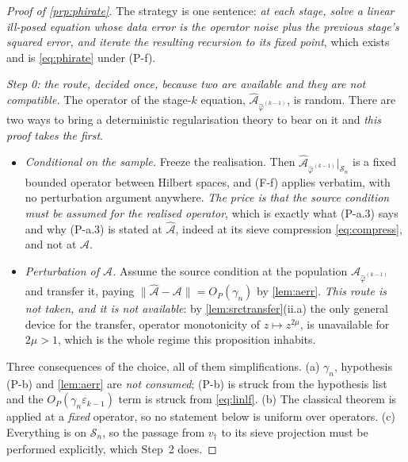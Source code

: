 \begin{proof}[Proof of \cref{prp:phirate}]
The strategy is one sentence: \emph{at each stage, solve a linear ill-posed equation whose data error
is the operator noise plus the previous stage's squared error, and iterate the resulting recursion to
its fixed point}, which exists and is \eqref{eq:phirate} under (P-f).

\emph{Step 0: the route, decided once, because two are available and they are not compatible.} The
operator of the stage-$k$ equation, $\hat{\mathcal A}_{\hat\varphi^{(k-1)}}$, is random. There are two
ways to bring a deterministic regularisation theory to bear on it and \emph{this proof takes the
first}.
\begin{itemize}
\item[--] \emph{Conditional on the sample.} Freeze the realisation. Then
$\hat{\mathcal A}_{\hat\varphi^{(k-1)}}\vert_{\mathcal S_n}$ is a fixed bounded operator between
Hilbert spaces, and (F-f) applies verbatim, with no perturbation argument anywhere. \emph{The price is
that the source condition must be assumed for the realised operator}, which is exactly what
(P-a.3) says and why (P-a.3) is stated at $\hat{\mathcal A}$, indeed at its sieve compression
\eqref{eq:compress}, and not at $\mathcal A$.
\item[--] \emph{Perturbation of $\mathcal A$.} Assume the source condition at the population
$\mathcal A_{\hat\varphi^{(k-1)}}$ and transfer it, paying $\|\hat{\mathcal A}-\mathcal A\|=O_P(\gamma_n)$
by \cref{lem:aerr}. \emph{This route is not taken, and it is not available}: by
\cref{lem:srctransfer}(ii.a) the only general device for the transfer, operator monotonicity of
$z\mapsto z^{2\mu}$, is unavailable for $2\mu>1$, which is the whole regime this proposition inhabits.
\end{itemize}
Three consequences of the choice, all of them simplifications. (a) $\gamma_n$, hypothesis (P-b) and \cref{lem:aerr} are
\emph{not consumed}; (P-b) is struck from the hypothesis list and the $O_P(\gamma_n\varepsilon_{k-1})$ term is
struck from \eqref{eq:linlf}. (b) The classical theorem is applied at a \emph{fixed} operator, so no
statement below is uniform over operators. (c) Everything is on $\mathcal S_n$, so the passage from
$v_\dagger$ to its sieve projection must be performed explicitly, which Step~2 does.


\end{proof}

